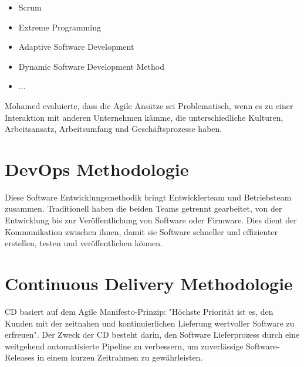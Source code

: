 \begin{itemize}
	\item Scrum
	\item Extreme Programming
	\item Adaptive Software Development
	\item Dynamic Software Development Method
	\item ...
\end{itemize}

Mohamed \cite{FernandoBritoE:AbreuDaSilva} evaluierte, dass die Agile Ansätze sei Problematisch, wenn es zu einer Interaktion mit anderen Unternehmen
kämme, die unterschiedliche Kulturen, Arbeitsansatz, Arbeitsumfang und Geschäftsprozesse
haben.

\section{DevOps Methodologie}

Diese Software Entwicklungsmethodik bringt Entwicklerteam und Betriebsteam zusammen.
Traditionell haben die beiden Teams getrennt gearbeitet, von der Entwicklung
bis zur Veröffentlichung von Software oder Firmware. Dies dient der Kommunikation
zwischen ihnen, damit sie Software schneller und effizienter erstellen, testen
und veröffentlichen können\cite{Novatec}.

\section{Continuous Delivery Methodologie}

\ac{CD} basiert auf dem Agile Manifesto-Prinzip: "Höchste Priorität ist es, den Kunden mit der zeitnahen und kontinuierlichen Lieferung wertvoller Software zu erfreuen". Der Zweck der \acs{CD} besteht darin, den Software Lieferprozess durch eine weitgehend automatisierte Pipeline zu verbessern, um zuverlässige Software-Releases in einem kurzen Zeitrahmen zu gewährleisten.
